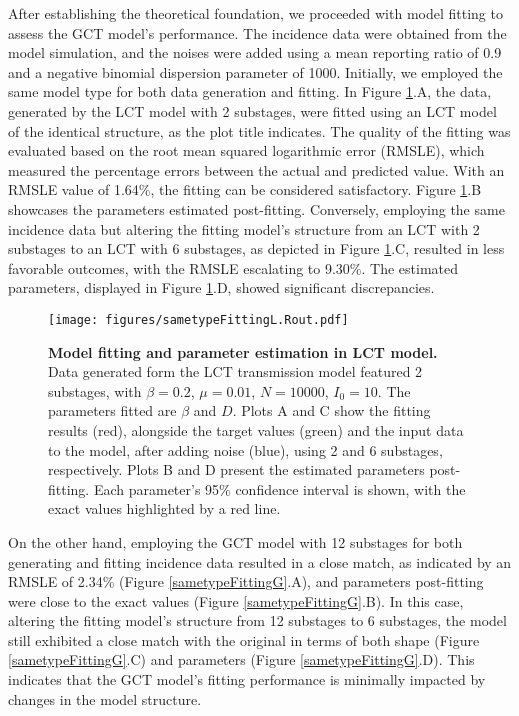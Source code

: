 \documentclass[12pt]{article}
\begin{document}
After establishing the theoretical foundation, we proceeded with model fitting to assess the GCT model's performance. The incidence data were obtained from the model simulation, and the noises were added using a mean reporting ratio of 0.9 and a negative binomial dispersion parameter of 1000. Initially, we employed the same model type for both data generation and fitting. In Figure \ref{sametypeFittingL}.A, the data, generated by the LCT model with 2 substages, were fitted using an LCT model of the identical structure, as the plot title indicates. The quality of the fitting was evaluated based on the root mean squared logarithmic error (RMSLE), which measured the percentage errors between the actual and predicted value. With an RMSLE value of 1.64\%, the fitting can be considered satisfactory. Figure \ref{sametypeFittingL}.B showcases the parameters estimated post-fitting. Conversely, employing the same incidence data but altering the fitting model's structure from an LCT with 2 substages to an LCT with 6 substages, as depicted in Figure \ref{sametypeFittingL}.C, resulted in less favorable outcomes, with the RMSLE escalating to 9.30\%. The estimated parameters, displayed in Figure \ref{sametypeFittingL}.D, showed significant discrepancies. 

\begin{figure}[h!]
    \centering
    \texttt{[image: figures/sametypeFittingL.Rout.pdf]}
    \caption{\textbf{Model fitting and parameter estimation in LCT model.} \\ Data generated form the LCT transmission model featured 2 substages, with $\beta=0.2$, $\mu=0.01$, $N=10000$, $I_0=10$. The parameters fitted are $\beta$ and $D$. Plots A and C show the fitting results (red), alongside the target values (green) and the input data to the model, after adding noise (blue), using 2 and 6 substages, respectively. Plots B and D present the estimated parameters post-fitting. Each parameter's 95\% confidence interval is shown, with the exact values highlighted by a red line.}
    \label{sametypeFittingL}
\end{figure}

On the other hand, employing the GCT model with 12 substages for both generating and fitting incidence data resulted in a close match, as indicated by an RMSLE of 2.34\% (Figure \ref{sametypeFittingG}.A), and parameters post-fitting were close to the exact values (Figure \ref{sametypeFittingG}.B). In this case, altering the fitting model's structure from 12 substages to 6 substages, the model still exhibited a close match with the original in terms of both shape (Figure \ref{sametypeFittingG}.C) and parameters (Figure \ref{sametypeFittingG}.D). This indicates that the GCT model's fitting performance is minimally impacted by changes in the model structure.
\end{document}
